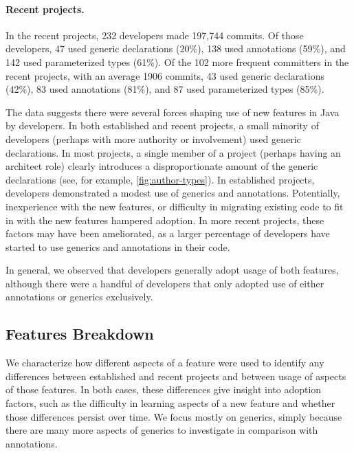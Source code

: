\documentclass{svjour3}
\begin{document}
\paragraph{Recent projects.}In the recent projects, 232 developers made 197,744 commits.  
Of those developers, 47 used generic declarations (20\%), 138 used annotations (59\%), and 142 used parameterized types (61\%).
Of the 102 more frequent committers in the recent projects, with an average 1906 commits, 43 used generic declarations (42\%), 83 used annotations (81\%), and 87 used parameterized types (85\%).

The data suggests there were several forces shaping use of new features in Java by developers.  In both established and recent projects, a small minority of developers (perhaps with more authority or involvement) used generic declarations.  In most projects, a single member of a project (perhaps having an architect role) clearly
introduces a disproportionate amount of the generic declarations (see, for example, \autoref{fig:author-types}).
In established projects, developers demonstrated a modest use of generics and annotations.  Potentially, inexperience with the new features, or difficulty in migrating existing code to fit in with the new features hampered adoption.  In more recent projects, these factors may have been ameliorated, as a larger percentage of developers have started to use generics and annotations in their code.

In general, we observed that developers generally adopt usage of both features, although there were a handful of developers that only adopted use of either annotations or generics exclusively.



\subsection{Features Breakdown}

We characterize how different aspects of a feature were used
to identify any differences between established and recent projects
and between usage of aspects of those features.  
In both cases, these differences give insight into adoption factors,
such as the difficulty in learning aspects of a new feature 
and whether those differences persist over time. 
We focus mostly on generics, simply because there are many more aspects 
of generics to investigate in comparison with annotations.
\end{document}
